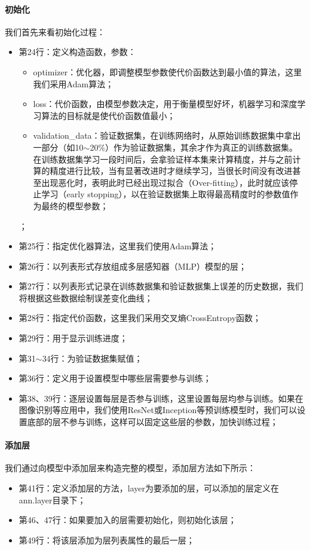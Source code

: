 \documentclass[UTF8]{article}
\begin{document}
\paragraph{初始化}
我们首先来看初始化过程：
\begin{itemize}
\item 第24行：定义构造函数，参数：
	\begin{itemize}
	\item optimizer：优化器，即调整模型参数使代价函数达到最小值的算法，这里我们采用Adam算法；
	\item loss：代价函数，由模型参数决定，用于衡量模型好坏，机器学习和深度学习算法的目标就是使代价函数值最小；
	\item validation\_data：验证数据集，在训练网络时，从原始训练数据集中拿出一部分（如10$\sim$20\%）作为验证数据集，其余才作为真正的训练数据集。在训练数据集学习一段时间后，会拿验证样本集来计算精度，并与之前计算的精度进行比较，当有显著改进时才继续学习，当很长时间没有改进甚至出现恶化时，表明此时已经出现过拟合（Over-fitting），此时就应该停止学习（early stopping），以在验证数据集上取得最高精度时的参数值作为最终的模型参数；
	\end{itemize}；
\item 第25行：指定优化器算法，这里我们使用Adam算法；
\item 第26行：以列表形式存放组成多层感知器（MLP）模型的层；
\item 第27行：以列表形式记录在训练数据集和验证数据集上误差的历史数据，我们将根据这些数据绘制误差变化曲线；
\item 第28行：指定代价函数，这里我们采用交叉熵CrossEntropy函数；
\item 第29行：用于显示训练进度；
\item 第31$\sim$34行：为验证数据集赋值；
\item 第36行：定义用于设置模型中哪些层需要参与训练；
\item 第38、39行：逐层设置每层是否参与训练，这里设置每层均参与训练。如果在图像识别等应用中，我们使用ResNet或Inception等预训练模型时，我们可以设置底部的层不参与训练，这样可以固定这些层的参数，加快训练过程；
\end{itemize}
\paragraph{添加层}
我们通过向模型中添加层来构造完整的模型，添加层方法如下所示：
\begin{itemize}
\item 第41行：定义添加层的方法，layer为要添加的层，可以添加的层定义在ann.layer目录下；
\item 第46、47行：如果要加入的层需要初始化，则初始化该层；
\item 第49行：将该层添加为层列表属性的最后一层；
\end{itemize}
\end{document}
